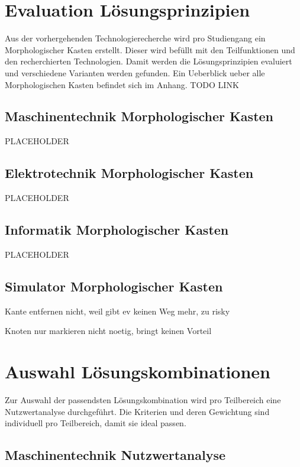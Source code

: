 \section{Evaluation Lösungsprinzipien}

Aus der vorhergehenden Technologierecherche wird pro Studiengang ein Morphologischer Kasten erstellt. Dieser wird befüllt mit den Teilfunktionen und den recherchierten Technologien. Damit werden die Lösungsprinzipien evaluiert und verschiedene Varianten werden gefunden. Ein Ueberblick ueber alle Morphologischen Kasten befindet sich im Anhang. TODO LINK

\subsection{Maschinentechnik Morphologischer Kasten}

PLACEHOLDER

\subsection{Elektrotechnik Morphologischer Kasten}

PLACEHOLDER

\subsection{Informatik Morphologischer Kasten}

PLACEHOLDER

\subsection{Simulator Morphologischer Kasten}

Kante entfernen nicht, weil gibt ev keinen Weg mehr, zu risky

Knoten nur markieren nicht noetig, bringt keinen Vorteil


\newpage
\section{Auswahl Lösungskombinationen}

Zur Auswahl der passendsten Lösungskombination wird pro Teilbereich eine Nutzwertanalyse durchgeführt. Die Kriterien und deren Gewichtung sind individuell pro Teilbereich, damit sie ideal passen.

\subsection{Maschinentechnik Nutzwertanalyse}

